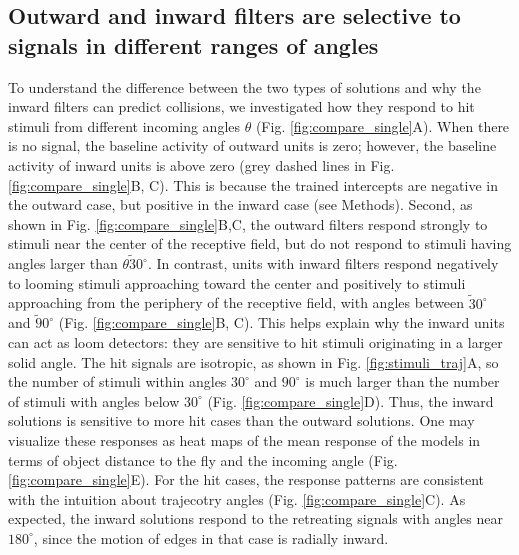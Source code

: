 \documentclass[pdftex,9pt,lineno]{elife}
\begin{document}
\begin{figure}
\end{figure}


\subsection{Outward and inward filters are selective to signals in different ranges of angles}

To understand the difference between the two types of solutions and why the inward filters can predict collisions, we investigated how they respond to hit stimuli from different incoming angles $\theta$ (Fig. \ref{fig:compare_single}A). When there is no signal, the baseline activity of outward units is zero; however, the baseline activity of inward units is above zero (grey dashed lines in Fig. \ref{fig:compare_single}B, C). This is because the trained intercepts are negative in the outward case, but positive in the inward case (see Methods). Second, as shown in Fig. \ref{fig:compare_single}B,C, the outward filters respond strongly to stimuli near the center of the receptive field, but do not respond to stimuli having angles larger than $\theta \tilde 30^{\circ}$. In contrast, units with inward filters respond negatively to looming stimuli approaching toward the center and positively to stimuli approaching from the periphery of the receptive field, with angles between $\tilde 30^{\circ}$ and $\tilde 90^{\circ}$ (Fig. \ref{fig:compare_single}B, C). This helps explain why the inward units can act as loom detectors: they are sensitive to hit stimuli originating in a larger solid angle. The hit signals are isotropic, as shown in Fig. \ref{fig:stimuli_traj}A, so the number of stimuli within angles $30^{\circ}$ and $90^{\circ}$ is much larger than the number of stimuli with angles below $30^{\circ}$ (Fig. \ref{fig:compare_single}D). Thus, the inward solutions is sensitive to more hit cases than the outward solutions. One may visualize these responses as heat maps of the mean response of the models in terms of object distance to the fly and the incoming angle (Fig. \ref{fig:compare_single}E). For the hit cases, the response patterns are consistent with the intuition about trajecotry angles (Fig. \ref{fig:compare_single}C). As expected, the inward solutions respond to the retreating signals with angles near $180^{\circ}$, since the motion of edges in that case is radially inward.
\end{document}
